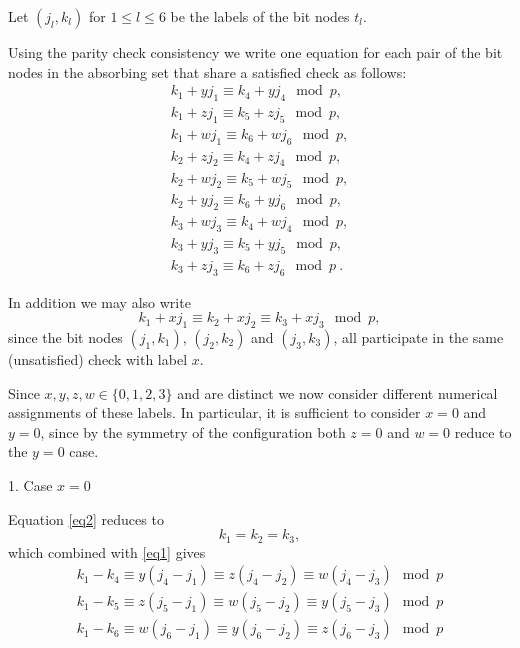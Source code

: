 Let $(j_l,k_l)$ for $1 \leq l \leq 6$ be the labels of the bit
nodes $t_l$.

Using the parity check consistency we write one equation for each
pair of the bit nodes in the absorbing set that share a satisfied
check as follows:
\begin{equation}\label{eq1}\begin{array}{cccc}
k_1+yj_1 \equiv k_4+yj_4 \mod p,\\
k_1+zj_1 \equiv k_5+zj_5 \mod p,\\
k_1+wj_1 \equiv k_6+wj_6 \mod p,\\
k_2+zj_2 \equiv k_4+zj_4 \mod p,\\
k_2+wj_2 \equiv k_5+wj_5 \mod p,\\
k_2+yj_2 \equiv k_6+yj_6 \mod p,\\
k_3+wj_3 \equiv k_4+wj_4 \mod p,\\
k_3+yj_3 \equiv k_5+yj_5 \mod p,\\
k_3+zj_3 \equiv k_6+zj_6 \mod p~.
\end{array}\end{equation}

In addition we may also write
\begin{equation}\label{eq2}
k_1+xj_1 \equiv k_2+xj_2 \equiv k_3+xj_3 \mod p,
\end{equation}
since the bit nodes $(j_1,k_1)$, $(j_2,k_2)$ and $(j_3,k_3)$, all
participate in the same (unsatisfied) check with label $x$.

Since $x,y,z,w \in \{0,1,2,3\}$ and are distinct we now consider
different numerical assignments of these labels. In particular, it
is sufficient to consider $x=0$ and $y=0$, since by the symmetry
of the configuration both $z=0$ and $w=0$ reduce to the $y=0$
case.

1. Case $x=0$

Equation \eqref{eq2} reduces to
\begin{equation}
k_1 = k_2 = k_3,
\end{equation}
which combined with \eqref{eq1} gives
\begin{equation}\begin{array}{cccc}
k_1-k_4 \equiv y(j_4-j_1) \equiv z(j_4-j_2) \equiv w(j_4-j_3) \mod
p\\
k_1-k_5 \equiv z(j_5-j_1) \equiv w(j_5-j_2) \equiv y(j_5-j_3) \mod
p\\
k_1-k_6 \equiv w(j_6-j_1) \equiv y(j_6-j_2) \equiv z(j_6-j_3) \mod
p
\end{array}
\end{equation}

